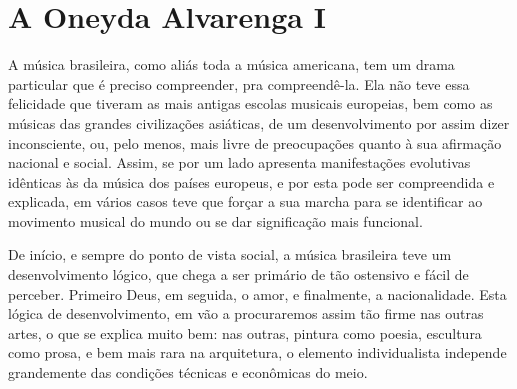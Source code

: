 \section*{A Oneyda Alvarenga I}

A música brasileira, como aliás toda a música americana, tem um drama
particular que é preciso compreender, pra compreendê-la. Ela não teve
essa felicidade que tiveram as mais antigas escolas musicais europeias,
bem como as músicas das grandes civilizações asiáticas, de um
desenvolvimento por assim dizer inconsciente, ou, pelo menos, mais livre
de preocupações quanto à sua afirmação nacional e social. Assim, se por
um lado apresenta manifestações evolutivas idênticas às da música dos
países europeus, e por esta pode ser compreendida e explicada, em vários
casos teve que forçar a sua marcha para se identificar ao movimento
musical do mundo ou se dar significação mais funcional.

De início, e sempre do ponto de vista social, a música brasileira teve
um desenvolvimento lógico, que chega a ser primário de tão ostensivo e
fácil de perceber. Primeiro Deus, em seguida, o amor, e finalmente, a
nacionalidade. Esta lógica de desenvolvimento, em vão a procuraremos
assim tão firme nas outras artes, o que se explica muito bem: nas
outras, pintura como poesia, escultura como prosa, e bem mais rara na
arquitetura, o elemento individualista independe grandemente das
condições técnicas e econômicas do meio.

